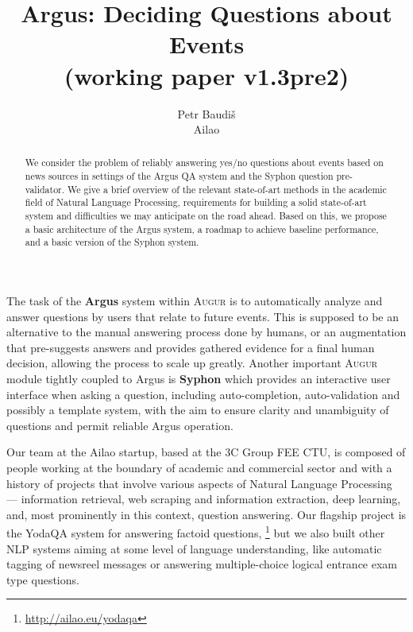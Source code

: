 \documentclass[11pt,a4paper]{article}
\title{Argus: Deciding Questions about Events \\ (working paper v1.3pre2)}
\author{Petr Baudiš \\ Ailao}
\begin{document}
\maketitle

\begin{abstract}%
	We consider the problem of reliably answering yes/no questions
	about events based on news sources in settings of the Argus QA
	system and the Syphon question pre-validator.
	We give a brief overview of the relevant state-of-art methods
	in the academic field of Natural Language Processing,
	requirements for building a solid state-of-art system
	and difficulties we may anticipate on the road ahead.
	Based on this, we propose a basic architecture of the Argus
	system, a roadmap to achieve baseline performance, and a basic
	version of the Syphon system.
\end{abstract}

\vspace{3ex}

The task of the \textbf{Argus} system within \textsc{Augur}
is to automatically analyze and answer
questions by users that relate to future events.  This is supposed
to be an alternative to the manual answering process done by humans,
or an augmentation that pre-suggests answers and provides gathered
evidence for a final human decision, allowing the process to scale
up greatly.  Another important \textsc{Augur} module tightly
coupled to Argus is \textbf{Syphon} which provides an interactive
user interface when asking a question, including auto-completion,
auto-validation and possibly a template system, with the aim to
ensure clarity and unambiguity of questions and permit reliable
Argus operation.

Our team at the Ailao startup, based at the 3C Group FEE CTU,
is composed of people working at the boundary of academic and commercial
sector and with a history of projects that involve
various aspects of Natural Language Processing ---
information retrieval, web scraping and information extraction,
deep learning, and, most prominently in this context, question answering.
Our flagship project is the YodaQA system for answering factoid questions,%
\footnote{\url{http://ailao.eu/yodaqa}}
but we also built other NLP systems aiming at some level of language understanding,
like automatic tagging of newsreel messages
or answering multiple-choice logical entrance exam type questions.
\end{document}
